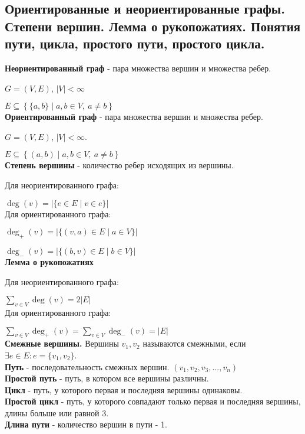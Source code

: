 \subsection{Ориентированные и неориентированные графы. Степени вершин. Лемма о рукопожатиях. Понятия пути, цикла, простого пути, простого цикла.}
\textbf{Неориентированный граф} - пара множества вершин и множества ребер.

$G = (V, E)$, $|V| < \infty$

$E \subseteq \left\{ \{a, b\} \mid a, b \in V, \ a \neq b\right\}$\\

\textbf{Ориентированный граф} - пара множества вершин и множества ребер.

$G = (V, E)$, $|V| < \infty$.

$E \subseteq \left\{ (a, b) \mid a, b \in V, \ a \neq b\right\}$\\

\textbf{Степень вершины} - количество ребер исходящих из вершины.

Для неориентированного графа:

$\deg (v) = |\{e \in E \mid v \in e\}|$\\

Для ориентированного графа:

$\deg_{+} (v) = |\{(v, a) \in E \mid a \in V\}|$

$\deg_{-} (v) = |\{(b, v) \in E \mid b \in V\}|$\\

\textbf{Лемма о рукопожатиях}

Для неориентированного графа:

$\sum\limits_{v \in V} \deg (v) = 2 |E|$\\

Для ориентированного графа:

$\sum\limits_{v \in V} \deg_{+} (v) = \sum\limits_{v \in V} \deg_{-} (v) = |E|$\\

\textbf{Смежные вершины.} Вершины $v_1, v_2$ называются смежными, если $\exists e \in E : e = \{v_1, v_2\}$.\\

\textbf{Путь} - последовательность смежных вершин. $(v_1, v_2, v_3, ..., v_n)$\\

\textbf{Простой путь} - путь, в котором все вершины различны.\\

\textbf{Цикл} - путь, у которого первая и последняя вершины одинаковы.\\

\textbf{Простой цикл} - путь, у которого совпадают только первая и последняя вершины, длины больше или равной 3.\\

\textbf{Длина пути} - количество вершин в пути - 1.